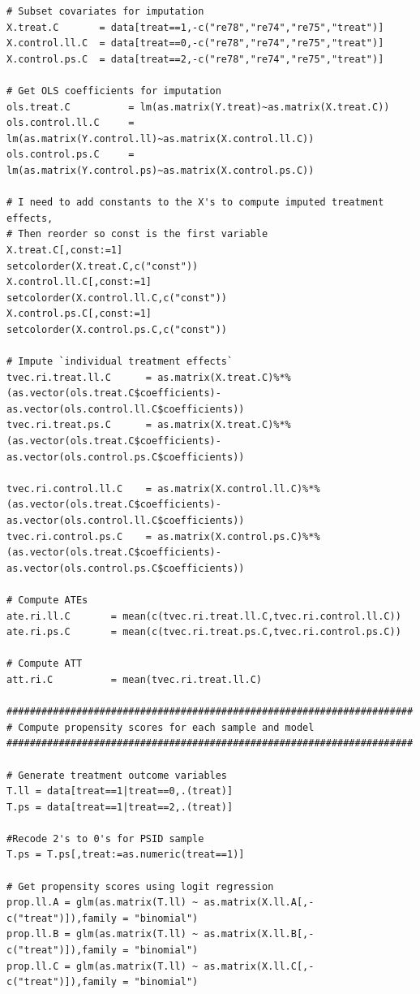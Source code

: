 \documentclass[12pt]{article}
\begin{document}
\begin{verbatim}
# Subset covariates for imputation
X.treat.C       = data[treat==1,-c("re78","re74","re75","treat")]
X.control.ll.C  = data[treat==0,-c("re78","re74","re75","treat")]
X.control.ps.C  = data[treat==2,-c("re78","re74","re75","treat")]

# Get OLS coefficients for imputation
ols.treat.C          = lm(as.matrix(Y.treat)~as.matrix(X.treat.C))
ols.control.ll.C     = lm(as.matrix(Y.control.ll)~as.matrix(X.control.ll.C))
ols.control.ps.C     = lm(as.matrix(Y.control.ps)~as.matrix(X.control.ps.C))

# I need to add constants to the X's to compute imputed treatment effects,
# Then reorder so const is the first variable
X.treat.C[,const:=1]
setcolorder(X.treat.C,c("const"))
X.control.ll.C[,const:=1]
setcolorder(X.control.ll.C,c("const"))
X.control.ps.C[,const:=1]
setcolorder(X.control.ps.C,c("const"))

# Impute `individual treatment effects`
tvec.ri.treat.ll.C      = as.matrix(X.treat.C)%*%(as.vector(ols.treat.C$coefficients)-as.vector(ols.control.ll.C$coefficients))
tvec.ri.treat.ps.C      = as.matrix(X.treat.C)%*%(as.vector(ols.treat.C$coefficients)-as.vector(ols.control.ps.C$coefficients))

tvec.ri.control.ll.C    = as.matrix(X.control.ll.C)%*%(as.vector(ols.treat.C$coefficients)-as.vector(ols.control.ll.C$coefficients))  
tvec.ri.control.ps.C    = as.matrix(X.control.ps.C)%*%(as.vector(ols.treat.C$coefficients)-as.vector(ols.control.ps.C$coefficients))  

# Compute ATEs
ate.ri.ll.C       = mean(c(tvec.ri.treat.ll.C,tvec.ri.control.ll.C))
ate.ri.ps.C       = mean(c(tvec.ri.treat.ps.C,tvec.ri.control.ps.C))

# Compute ATT
att.ri.C          = mean(tvec.ri.treat.ll.C)

######################################################################
# Compute propensity scores for each sample and model
######################################################################

# Generate treatment outcome variables
T.ll = data[treat==1|treat==0,.(treat)]
T.ps = data[treat==1|treat==2,.(treat)]

#Recode 2's to 0's for PSID sample
T.ps = T.ps[,treat:=as.numeric(treat==1)]

# Get propensity scores using logit regression
prop.ll.A = glm(as.matrix(T.ll) ~ as.matrix(X.ll.A[,-c("treat")]),family = "binomial")
prop.ll.B = glm(as.matrix(T.ll) ~ as.matrix(X.ll.B[,-c("treat")]),family = "binomial")
prop.ll.C = glm(as.matrix(T.ll) ~ as.matrix(X.ll.C[,-c("treat")]),family = "binomial")


\end{verbatim}
\end{document}
